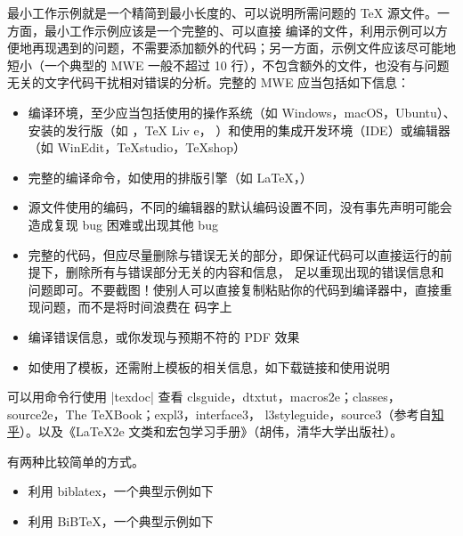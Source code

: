 最小工作示例就是一个精简到最小长度的、可以说明所需问题的 \TeX{} 源文件。一方面，最小工作示例应该是一个完整的、可以直接
编译的文件，利用示例可以方便地再现遇到的问题，不需要添加额外的代码；另一方面，示例文件应该尽可能地短小（一个典型的 MWE
一般不超过 10 行），不包含额外的文件，也没有与问题无关的文字代码干扰相对错误的分析。完整的 MWE 应当包括如下信息：
\begin{itemize}
\item 编译环境，至少应当包括使用的操作系统（如 Windows，macOS，Ubuntu）、安装的发行版（如 \CTeX{}，\TeX{} Liv
  e，\MacTeX{} ）和使用的集成开发环境（IDE）或编辑器（如 WinEdit，TeXstudio，TeXshop）
\item 完整的编译命令，如使用的排版引擎（如 \LaTeX{}，\XeLaTeX{}）
\item 源文件使用的编码，不同的编辑器的默认编码设置不同，没有事先声明可能会造成复现 bug 困难或出现其他 bug
\item 完整的代码，但应尽量删除与错误无关的部分，即保证代码可以直接运行的前提下，删除所有与错误部分无关的内容和信息，
  足以重现出现的错误信息和问题即可。不要截图！使别人可以直接复制粘贴你的代码到编译器中，直接重现问题，而不是将时间浪费在
  码字上
\item 编译错误信息，或你发现与预期不符的 PDF 效果
\item 如使用了模板，还需附上模板的相关信息，如下载链接和使用说明
\end{itemize}



可以用命令行使用 |texdoc| 查看 clsguide，dtxtut，macros2e；classes，source2e，The TeXBook；expl3，interface3，
l3styleguide，source3（参考自\href{https://www.zhihu.com/question/27017364}{知乎}）。以及《\LaTeX{2e}
文类和宏包学习手册》（胡伟，清华大学出版社）。









有两种比较简单的方式。
\begin{itemize}
\item 利用 biblatex，一个典型示例如下
\item 利用 BiB\TeX，一个典型示例如下
\end{itemize}


